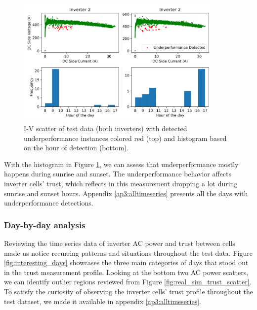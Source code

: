 \begin{figure}[h!]
    \centering
    \includegraphics[width=0.9\textwidth]{figures/chapter5/results/real/53_pv_plugin_detections-1.png}
    \caption{I-V scatter of test data (both inverters) with detected underperformance instances colored red (top) and histogram based on the hour of detection (bottom).}
    \label{fig:plugin_detections}
\end{figure}

With the histogram in Figure \ref{fig:plugin_detections}, we can assess that underperformance mostly happens during sunrise and sunset. The underperformance behavior affects inverter cells' trust, which reflects in this measurement dropping a lot during sunrise and sunset hours. Appendix \ref{ap3:alltimeseries} presents all the days with underperformance detections.

\subsubsection{Day-by-day analysis}

Reviewing the time series data of inverter AC power and trust between cells made us notice recurring patterns and situations throughout the test data. Figure \ref{fig:interesting_days} showcases the three main categories of days that stood out in the trust measurement profile. Looking at the bottom two AC power scatters, we can identify outlier regions reviewed from Figure \ref{fig:real_sim_trust_scatter}. To satisfy the curiosity of observing the inverter cells' trust profile throughout the test dataset, we made it available in appendix \ref{ap3:alltimeseries}.

